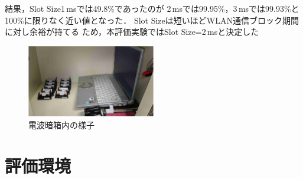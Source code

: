 \documentclass[12pt]{jreport}
\begin{document}
結果，Slot Size1\,msでは49.8\%であったのが
2\,msでは99.95\%，3\,msでは99.93\%と100\%に限りなく近い値となった．
Slot Sizeは短いほどWLAN通信ブロック期間に対し余裕が持てる
ため，本評価実験ではSlot Size=2\,msと決定した

\begin{figure}[bt]
 \centering
 \includegraphics[width=0.5\textwidth]{figure/nowave_box.pdf}
 \caption{電波暗箱内の様子}
 \label{fig:nowave_box}
\end{figure}

\section{評価環境}
\end{document}
